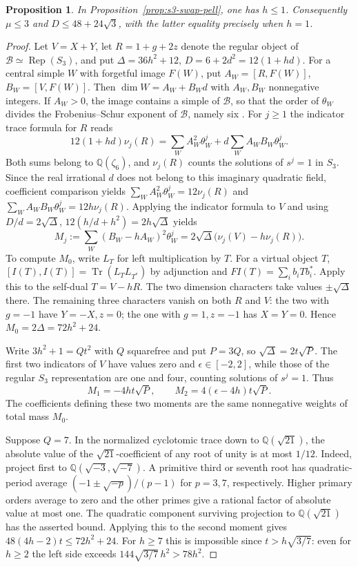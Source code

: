 \documentclass[11pt,a4paper]{article}
\newtheorem{proposition}[theorem]{Proposition}
\numberwithin{equation}{section}
\begin{document}
\begin{proposition}\label{prop:s3-complete}
In Proposition~\ref{prop:s3-swap-pell}, one has $h\le1$. Consequently $\mu\le3$ and $D\le48+24\sqrt3$, with the latter equality precisely when $h=1$.
\end{proposition}
\begin{proof}
Let $V=X+Y$, let $R=1+g+2z$ denote the regular object of
$\mathcal B\simeq\operatorname{Rep}(S_3)$, and put
$\Delta=36h^2+12$, $D=6+2d^2=12(1+hd)$.
For a central simple $W$ with forgetful image $F(W)$, put
$A_W=[R,F(W)]$, $B_W=[V,F(W)]$. Then
$\dim W=A_W+B_Wd$ with $A_W,B_W$ nonnegative integers.
If $A_W>0$, the image contains a simple of $\mathcal B$, so that
the order of $\theta_W$ divides the Frobenius--Schur exponent of
$\mathcal B$, namely six
\cite[Proposition~2.2(2)]{SWY}. For $j\ge1$ the indicator trace formula for $R$ reads
\[
 12(1+hd)\nu_j(R)=\sum_W A_W^2\theta_W^j+
                         d\sum_W A_W B_W\theta_W^j.
\]
Both sums belong to $\mathbb Q(\zeta_6)$, and $\nu_j(R)$ counts the
solutions of $s^j=1$ in $S_3$. Since the real irrational $d$ does not
belong to this imaginary quadratic field, coefficient comparison yields
$\sum_W A_W^2\theta_W^j=12\nu_j(R)$ and
$\sum_W A_W B_W\theta_W^j=12h\nu_j(R)$. Applying the indicator formula to $V$ and
using $D/d=2\sqrt\Delta$, $12(h/d+h^2)=2h\sqrt\Delta$ yields
\[
 M_j:=\sum_W (B_W-hA_W)^2\theta_W^j
     =2\sqrt\Delta\bigl(\nu_j(V)-h\nu_j(R)\bigr).
\]
To compute $M_0$, write $L_T$ for left multiplication by $T$.
For a virtual object $T$,
$[I(T),I(T)]=\operatorname{Tr}(L_T L_{T^*})$
by adjunction and $FI(T)=\sum_i b_i T b_i^*$.
Apply this to the self-dual $T=V-hR$. The two dimension characters
take values $\pm\sqrt\Delta$ there. The remaining three characters
vanish on both $R$ and $V$: the two with $g=-1$ have $Y=-X,z=0$;
the one with $g=1,z=-1$ has $X=Y=0$. Hence
$M_0=2\Delta=72h^2+24$.

Write $3h^2+1=Qt^2$ with $Q$ squarefree and put $P=3Q$, so
$\sqrt\Delta=2t\sqrt P$.
The first two indicators of $V$ have values zero and
$\epsilon\in[-2,2]$, while those of the regular $S_3$ representation
are one and four, counting solutions of $s^j=1$. Thus
\begin{equation}\label{eq:s3-moments}
 M_1=-4ht\sqrt P,\qquad M_2=4(\epsilon-4h)t\sqrt P.
\end{equation}
The coefficients defining these two moments are the same nonnegative
weights of total mass $M_0$.

Suppose $Q=7$. In the normalized cyclotomic trace down to
$\mathbb Q(\sqrt{21})$, the absolute value of the $\sqrt{21}$-coefficient
of any root of unity is at most $1/12$. Indeed, project first to
$\mathbb Q(\sqrt{-3},\sqrt{-7})$. A primitive third or seventh root
has quadratic-period average $(-1\pm\sqrt{-p})/(p-1)$ for
$p=3,7$, respectively. Higher primary orders average to zero and the
other primes give a rational factor of absolute value at most one.
The quadratic component surviving projection to $\mathbb Q(\sqrt{21})$
has the asserted bound. Applying this to the second moment gives
$48(4h-2)t\le72h^2+24$. For $h\ge7$ this is impossible since
$t>h\sqrt{3/7}$: even for $h\ge2$ the left side exceeds
$144\sqrt{3/7}\,h^2>78h^2$.


\end{proof}
\end{document}
